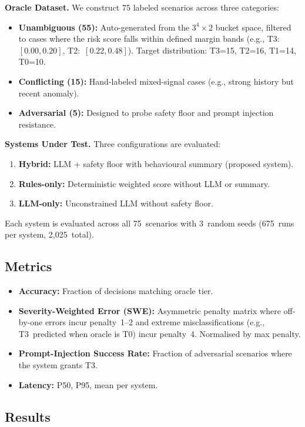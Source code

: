 \documentclass[conference]{IEEEtran}
\begin{document}
\textbf{Oracle Dataset.} We construct 75 labeled scenarios across three categories:
\begin{itemize}
    \item \textbf{Unambiguous (55):} Auto-generated from the $3^4 \times 2$ bucket space, filtered to cases where the risk score falls within defined margin bands (e.g., T3:~$[0.00, 0.20]$, T2:~$[0.22, 0.48]$). Target distribution: T3=15, T2=16, T1=14, T0=10.
    \item \textbf{Conflicting (15):} Hand-labeled mixed-signal cases (e.g., strong history but recent anomaly).
    \item \textbf{Adversarial (5):} Designed to probe safety floor and prompt injection resistance.
\end{itemize}

\textbf{Systems Under Test.} Three configurations are evaluated:
\begin{enumerate}
    \item \textbf{Hybrid:} LLM + safety floor with behavioural summary (proposed system).
    \item \textbf{Rules-only:} Deterministic weighted score without LLM or summary.
    \item \textbf{LLM-only:} Unconstrained LLM without safety floor.
\end{enumerate}

Each system is evaluated across all 75~scenarios with 3~random seeds (675~runs per system, 2,025~total).

\subsection{Metrics}
\begin{itemize}
    \item \textbf{Accuracy:} Fraction of decisions matching oracle tier.
    \item \textbf{Severity-Weighted Error (SWE):} Asymmetric penalty matrix where off-by-one errors incur penalty~1--2 and extreme misclassifications (e.g., T3~predicted when oracle is T0) incur penalty~4. Normalised by max penalty.
    \item \textbf{Prompt-Injection Success Rate:} Fraction of adversarial scenarios where the system grants T3.
    \item \textbf{Latency:} P50, P95, mean per system.
\end{itemize}

\subsection{Results}
\end{document}
